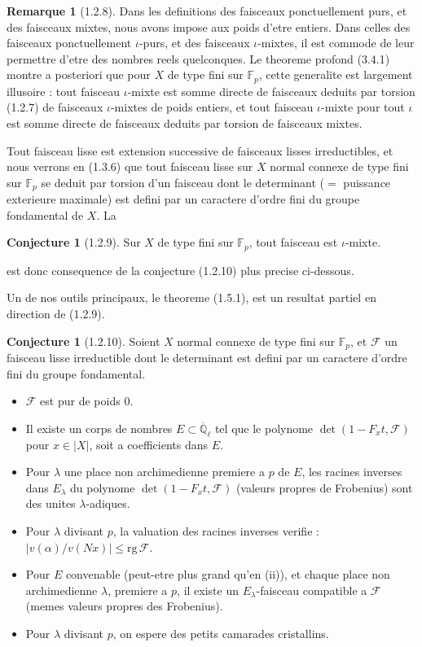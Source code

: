 \documentclass[12pt,a4paper]{article}
\theoremstyle{plain}
\theoremstyle{definition}
\newtheorem{remarque}[theorem]{Remarque}
\newtheorem{conjecture}[theorem]{Conjecture}
\theoremstyle{definition}
\theoremstyle{remark}
\begin{document}
\begin{remarque}[1.2.8]
Dans les definitions des faisceaux ponctuellement purs, et des faisceaux mixtes, nous avons impose aux poids d'etre entiers. Dans celles des faisceaux ponctuellement $\iota$-purs, et des faisceaux $\iota$-mixtes, il est commode de leur permettre d'etre des nombres reels quelconques. Le theoreme profond (3.4.1) montre a posteriori que pour $X$ de type fini sur $\mathbb{F}_p$, cette generalite est largement illusoire : tout faisceau $\iota$-mixte est somme directe de faisceaux deduits par torsion (1.2.7) de faisceaux $\iota$-mixtes de poids entiers, et tout faisceau $\iota$-mixte pour tout $\iota$ est somme directe de faisceaux deduits par torsion de faisceaux mixtes.

Tout faisceau lisse est extension successive de faisceaux lisses irreductibles, et nous verrons en (1.3.6) que tout faisceau lisse sur $X$ normal connexe de type fini sur $\mathbb{F}_p$ se deduit par torsion d'un faisceau dont le determinant ($=$ puissance exterieure maximale) est defini par un caractere d'ordre fini du groupe fondamental de $X$. La
\end{remarque}

\begin{conjecture}[1.2.9]
Sur $X$ de type fini sur $\mathbb{F}_p$, tout faisceau est $\iota$-mixte.
\end{conjecture}
est donc consequence de la conjecture (1.2.10) plus precise ci-dessous.

Un de nos outils principaux, le theoreme (1.5.1), est un resultat partiel en direction de (1.2.9).

\begin{conjecture}[1.2.10]
Soient $X$ normal connexe de type fini sur $\mathbb{F}_p$, et $\mathscr{F}$ un faisceau lisse irreductible dont le determinant est defini par un caractere d'ordre fini du groupe fondamental.
\begin{itemize}[nosep]
\item[(i)] $\mathscr{F}$ est pur de poids $0$.
\item[(ii)] Il existe un corps de nombres $E \subset \overline{\mathbb{Q}}_\ell$ tel que le polynome $\det(1 - F_x t, \mathscr{F})$ pour $x \in |X|$, soit a coefficients dans $E$.
\item[(iii)] Pour $\lambda$ une place non archimedienne premiere a $p$ de $E$, les racines inverses dans $E_\lambda$ du polynome $\det(1 - F_x t, \mathscr{F})$ (valeurs propres de Frobenius) sont des unites $\lambda$-adiques.
\item[(iv)] Pour $\lambda$ divisant $p$, la valuation des racines inverses verifie : $|v(\alpha) / v(Nx)| \leq \text{rg}\,\mathscr{F}$.
\item[(v)] Pour $E$ convenable (peut-etre plus grand qu'en (ii)), et chaque place non archimedienne $\lambda$, premiere a $p$, il existe un $E_\lambda$-faisceau compatible a $\mathscr{F}$ (memes valeurs propres des Frobenius).
\item[(vi)] Pour $\lambda$ divisant $p$, on espere des petits camarades cristallins.
\end{itemize}
\end{conjecture}
\end{document}
